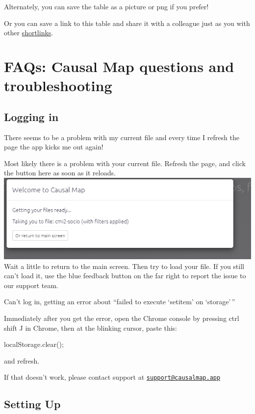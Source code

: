 \documentclass[
]{book}
\begin{document}
Alternately, you can save the table as a picture or png if you prefer!

Or you can save a link to this table and share it with a colleague just as you with other \href{xsharing_view}{shortlinks}.

\hypertarget{FAQs}{%
\chapter{FAQs: Causal Map questions and troubleshooting}\label{FAQs}}

\hypertarget{logging-in}{%
\section{Logging in}\label{logging-in}}

There seems to be a problem with my current file and every time I refresh the page the app kicks me out again!

Most likely there is a problem with your current file. Refresh the page, and click the button here as soon as it reloads.
\includegraphics{_assets/image-20211117201957585.png}
Wait a little to return to the main screen. Then try to load your file. If you still can't load it, use the blue feedback button on the far right to report the issue to our support team.

Can't log in, getting an error about ``failed to execute `setitem' on `storage'\,''

Immediately after you get the error, open the Chrome console by pressing ctrl shift J in Chrome,
then at the blinking cursor, paste this:

localStorage.clear();

and refresh.

If that doesn't work, please contact support at \href{mailto:support@causalmap.app}{\nolinkurl{support@causalmap.app}}

\hypertarget{setting-up}{%
\section{Setting Up}\label{setting-up}}
\end{document}
